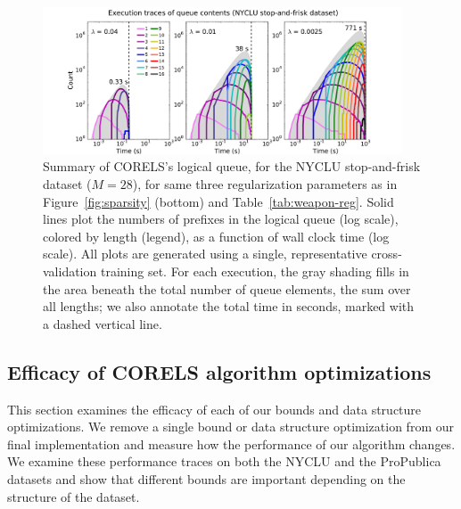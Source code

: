 \begin{figure}[t!]
\begin{center}
\includegraphics[trim={30mm 0mm 30mm 5mm},
width=0.95\textwidth]{figs/weapon_reg-queue.pdf}
\end{center}
\vspace{-5mm}
\caption{Summary of CORELS's logical queue,
for the NYCLU stop-and-frisk dataset (${M = 28}$),
for same three regularization parameters as in Figure~\ref{fig:sparsity} (bottom)
and Table~\ref{tab:weapon-reg}.
%
Solid lines plot the numbers of prefixes in the logical queue (log scale), colored by length (legend),
as a function of wall clock time (log scale).
%
All plots are generated using a single, representative cross-validation training set.
%
For each execution, the gray shading fills in the area beneath the total number
of queue elements, \ie the sum over all lengths;
we also annotate the total time in seconds, marked with a dashed vertical line.
}
\label{fig:queue-weapon-reg}
\end{figure}

\subsection{Efficacy of CORELS algorithm optimizations}
\label{sec:ablation}

This section examines the efficacy of each of our bounds and data structure optimizations.
%
We remove a single bound or data structure optimization from our final implementation and measure
how the performance of our algorithm changes.
%
We examine these performance traces on both the NYCLU and the ProPublica datasets and show that
different bounds are important depending on the structure of the dataset.

